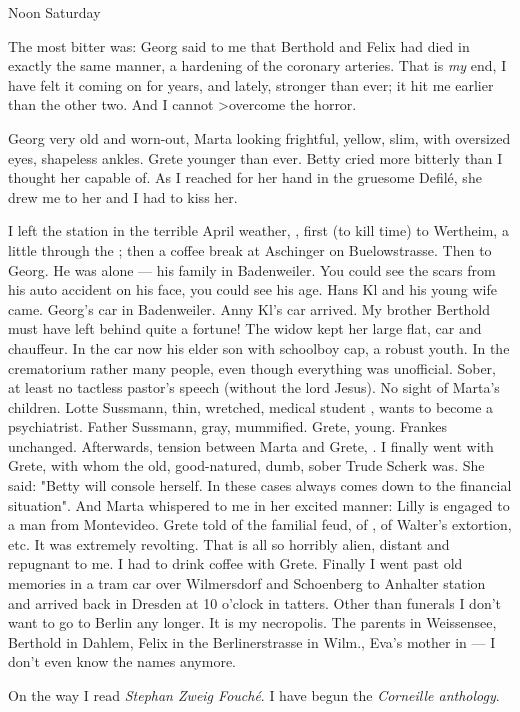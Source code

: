 Noon Saturday

The most bitter was: Georg said to me that Berthold and Felix had died in exactly the same manner, a hardening of the coronary arteries. That is \textit{my} end, I have felt it coming on for years, and lately, stronger than ever; it hit me earlier than the other two. And I cannot >overcome the horror.

Georg very old and worn-out, Marta looking frightful, yellow, slim, with oversized eyes, shapeless ankles. Grete younger than ever.
 Betty cried more bitterly than I thought her capable of. As I reached for her hand in the gruesome Defilé, she drew me to her and I had to kiss her. \missing

I left the station in the terrible April weather, , first (to kill time) to Wertheim, a little through the ; then a coffee break at Aschinger on Buelowstrasse. Then to Georg. He was alone — his family in Badenweiler. You could see the scars from his auto accident on his face, you could see his age. Hans Kl and his young wife came. Georg's car in Badenweiler. Anny Kl's car arrived. My brother Berthold must have left behind quite a fortune! The widow kept her large flat, car and chauffeur. \missing
In the car now his elder son with  schoolboy cap, a robust youth.
In the crematorium rather many people, even though everything was unofficial. Sober, at least no tactless pastor's speech (without the lord Jesus). No sight of Marta's children. Lotte Sussmann, thin, wretched, medical student , wants to become a psychiatrist. Father Sussmann, gray, mummified. Grete, young. Frankes unchanged.
Afterwards, tension between Marta and Grete, . I finally went with Grete, with whom the old, good-natured, dumb, sober Trude Scherk was. She said: "Betty will console herself. In these cases   always comes down to the financial situation". And Marta whispered to me in her excited manner: Lilly is engaged to a man from Montevideo. Grete told of the familial feud, of , of Walter's extortion, etc. It was extremely revolting. That is all so horribly alien, distant and repugnant to me. 
I had to drink coffee with Grete. Finally I went past old memories in a tram car over Wilmersdorf and Schoenberg to Anhalter station and arrived back in Dresden at 10 o'clock in tatters. 
Other than funerals I don't want to go to Berlin any longer. It is my necropolis. The parents in Weissensee, Berthold in Dahlem, Felix in the Berlinerstrasse in Wilm., Eva's mother in — I don't even know the names anymore.

On the way I read \textit{Stephan Zweig Fouché}.
I have begun the \textit{Corneille anthology}.

\missing